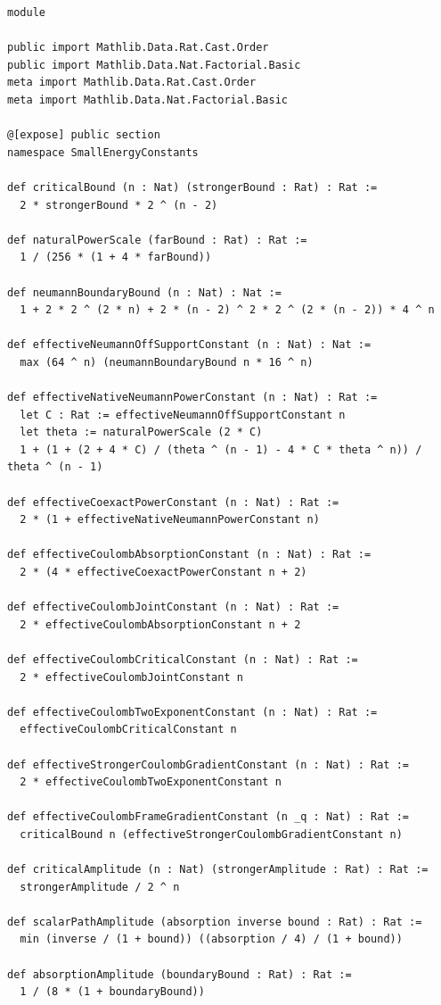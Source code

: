 \documentclass[11pt,a4paper]{article}
\numberwithin{equation}{section}
\theoremstyle{definition}
\theoremstyle{remark}
\begin{document}
\begin{lstlisting}
module

public import Mathlib.Data.Rat.Cast.Order
public import Mathlib.Data.Nat.Factorial.Basic
meta import Mathlib.Data.Rat.Cast.Order
meta import Mathlib.Data.Nat.Factorial.Basic

@[expose] public section
namespace SmallEnergyConstants

def criticalBound (n : Nat) (strongerBound : Rat) : Rat :=
  2 * strongerBound * 2 ^ (n - 2)

def naturalPowerScale (farBound : Rat) : Rat :=
  1 / (256 * (1 + 4 * farBound))

def neumannBoundaryBound (n : Nat) : Nat :=
  1 + 2 * 2 ^ (2 * n) + 2 * (n - 2) ^ 2 * 2 ^ (2 * (n - 2)) * 4 ^ n

def effectiveNeumannOffSupportConstant (n : Nat) : Nat :=
  max (64 ^ n) (neumannBoundaryBound n * 16 ^ n)

def effectiveNativeNeumannPowerConstant (n : Nat) : Rat :=
  let C : Rat := effectiveNeumannOffSupportConstant n
  let theta := naturalPowerScale (2 * C)
  1 + (1 + (2 + 4 * C) / (theta ^ (n - 1) - 4 * C * theta ^ n)) / theta ^ (n - 1)

def effectiveCoexactPowerConstant (n : Nat) : Rat :=
  2 * (1 + effectiveNativeNeumannPowerConstant n)

def effectiveCoulombAbsorptionConstant (n : Nat) : Rat :=
  2 * (4 * effectiveCoexactPowerConstant n + 2)

def effectiveCoulombJointConstant (n : Nat) : Rat :=
  2 * effectiveCoulombAbsorptionConstant n + 2

def effectiveCoulombCriticalConstant (n : Nat) : Rat :=
  2 * effectiveCoulombJointConstant n

def effectiveCoulombTwoExponentConstant (n : Nat) : Rat :=
  effectiveCoulombCriticalConstant n

def effectiveStrongerCoulombGradientConstant (n : Nat) : Rat :=
  2 * effectiveCoulombTwoExponentConstant n

def effectiveCoulombFrameGradientConstant (n _q : Nat) : Rat :=
  criticalBound n (effectiveStrongerCoulombGradientConstant n)

def criticalAmplitude (n : Nat) (strongerAmplitude : Rat) : Rat :=
  strongerAmplitude / 2 ^ n

def scalarPathAmplitude (absorption inverse bound : Rat) : Rat :=
  min (inverse / (1 + bound)) ((absorption / 4) / (1 + bound))

def absorptionAmplitude (boundaryBound : Rat) : Rat :=
  1 / (8 * (1 + boundaryBound))


\end{lstlisting}
\end{document}
